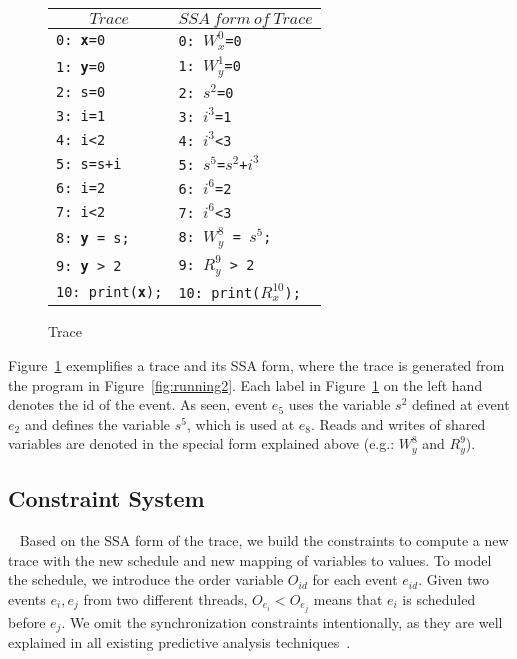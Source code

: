  
\begin{figure}
\centering
\begin{tabular}{l|l}
\hline
\multicolumn{1}{c}{$Trace$} & \multicolumn{1}{c}{$SSA \ form \ of\   Trace$} \\
\hline
{\tt 0: {\bf x}=0} &  {\tt 0: $W^0_x$=0}    \\
{\tt 1: {\bf y}=0} &   {\tt 1: $W^1_y$=0}   \\
{\tt 2: s=0} &  {\tt 2: $s^2$=0}   \\
{\tt 3: i=1} &     {\tt 3: $i^3$=1}   \\
{\tt 4: i<2} &    {\tt 4: $i^3$<3} \\
{\tt 5: s=s+i} & {\tt 5: $s^5$=$s^2$+$i^3$}   \\
{\tt 6: i=2} &       {\tt 6: $i^6$=2}  \\
{\tt 7: i<2} &      {\tt 7: $i^6$<3}  \\
{\tt 8: {\bf y} = s;} &  {\tt 8: $W^{8}_y$ = $s^5$;}  \\
{\tt 9: {\bf y} > 2}  &    {\tt 9: $R^{9}_y$ > 2} \\
{\tt 10: print({\bf x});} &  {\tt 10: print($R^{10}_x$);}  \\
\end{tabular}
\caption{Trace}
\label{fig:t4running2}
\end{figure}

Figure~\ref{fig:t4running2} exemplifies a trace and its SSA form, where the trace is generated from the program in Figure~\ref{fig:running2}.
Each label in  Figure~\ref{fig:t4running2} on the left hand denotes the id of the event. As seen, event $e_5$ uses the variable $s^2$ defined at event $e_2$ and defines the variable $s^5$, which is used at $e_8$. Reads and writes of shared variables are denoted in the special form explained above (e.g.: $W^{8}_y$ and  $R^{9}_y$).





\subsection{Constraint System}~\label{sec:constraints}
Based on the SSA form of the trace, we build the constraints to compute a new trace with the new schedule and new mapping of variables to values.
To model the schedule, we introduce the order variable $O_{id}$ for each event $e_{id}$. Given two events $e_i, e_j$ from two different threads, $O_{e_i}<O_{e_j}$ means that $e_i$ is scheduled before $e_j$. We omit the synchronization constraints intentionally, as they are well explained in all existing predictive analysis techniques~\cite{yannis, pldi14}.




